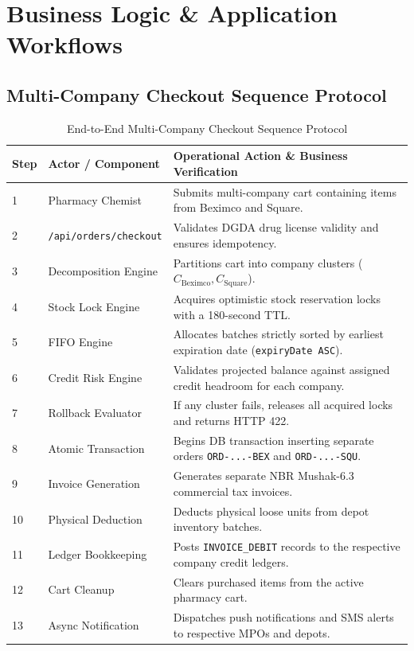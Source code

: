 \documentclass[10pt,a4paper]{article}
\begin{document}
\section{Business Logic \& Application Workflows}

\subsection{Multi-Company Checkout Sequence Protocol}
\begin{table}[h!]
\centering
\small
\begin{tabularx}{\textwidth}{lp{3.5cm}X}
\toprule
\textbf{Step} & \textbf{Actor / Component} & \textbf{Operational Action \& Business Verification} \\
\midrule
1 & Pharmacy Chemist & Submits multi-company cart containing items from Beximco and Square. \\
2 & \texttt{/api/orders/checkout} & Validates DGDA drug license validity and ensures idempotency. \\
3 & Decomposition Engine & Partitions cart into company clusters ($C_{\text{Beximco}}, C_{\text{Square}}$). \\
4 & Stock Lock Engine & Acquires optimistic stock reservation locks with a 180-second TTL. \\
5 & FIFO Engine & Allocates batches strictly sorted by earliest expiration date (\texttt{expiryDate ASC}). \\
6 & Credit Risk Engine & Validates projected balance against assigned credit headroom for each company. \\
7 & Rollback Evaluator & If any cluster fails, releases all acquired locks and returns HTTP 422. \\
8 & Atomic Transaction & Begins DB transaction inserting separate orders \texttt{ORD-...-BEX} and \texttt{ORD-...-SQU}. \\
9 & Invoice Generation & Generates separate NBR Mushak-6.3 commercial tax invoices. \\
10 & Physical Deduction & Deducts physical loose units from depot inventory batches. \\
11 & Ledger Bookkeeping & Posts \texttt{INVOICE\_DEBIT} records to the respective company credit ledgers. \\
12 & Cart Cleanup & Clears purchased items from the active pharmacy cart. \\
13 & Async Notification & Dispatches push notifications and SMS alerts to respective MPOs and depots. \\
\bottomrule
\end{tabularx}
\caption{End-to-End Multi-Company Checkout Sequence Protocol}
\end{table}
\end{document}
